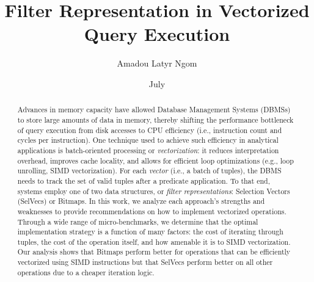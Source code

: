 \documentclass[12pt]{cmuthesis}
\begin{document}
 
\frontmatter

\pagestyle{empty}

\title{ %
{\bf Filter Representation in Vectorized Query Execution}}
\author{Amadou Latyr Ngom}
\date{July}
\trnumber{}


\support{}
\disclaimer{}



\maketitle

\begin{dedication}
\end{dedication}

\pagestyle{plain} %


\begin{abstract}
Advances in memory capacity have allowed Database Management Systems (DBMSs) to store large amounts of data in memory, thereby shifting the performance bottleneck of query execution from disk accesses to CPU efficiency (i.e., instruction count and cycles per instruction). One technique used to achieve such efficiency in analytical applications is batch-oriented processing or \textit{vectorization}: it reduces interpretation overhead, improves cache locality, and allows for efficient loop optimizations (e.g., loop unrolling, SIMD vectorization). For each \textit{vector} (i.e., a batch of tuples), the DBMS needs to track the set of valid tuples after a predicate application. To that end, systems employ one of two data structures, or \textit{filter representations}: Selection Vectors (SelVecs) or Bitmaps. In this work, we analyze each approach's strengths and weaknesses to provide recommendations on how to implement vectorized operations. Through a wide range of micro-benchmarks, we determine that the optimal implementation strategy is a function of many factors: the cost of iterating through tuples, the cost of the operation itself, and how amenable it is to SIMD vectorization. Our analysis shows that Bitmaps perform better for operations that can be efficiently vectorized using SIMD instructions but that SelVecs perform better on all other operations due to a cheaper iteration logic.
\end{abstract}
\end{document}
